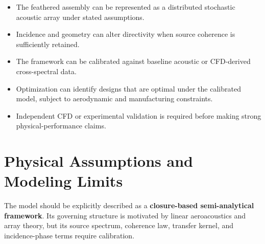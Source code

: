 \documentclass[11pt]{article}
\begin{document}
\begin{itemize}
    \item The feathered assembly can be represented as a distributed stochastic acoustic array under stated assumptions.
    \item Incidence and geometry can alter directivity when source coherence is sufficiently retained.
    \item The framework can be calibrated against baseline acoustic or CFD-derived cross-spectral data.
    \item Optimization can identify designs that are optimal under the calibrated model, subject to aerodynamic and manufacturing constraints.
    \item Independent CFD or experimental validation is required before making strong physical-performance claims.
\end{itemize}

\section{Physical Assumptions and Modeling Limits}

The model should be explicitly described as a \textbf{closure-based semi-analytical framework}. Its governing structure is motivated by linear aeroacoustics and array theory, but its source spectrum, coherence law, transfer kernel, and incidence-phase terms require calibration.
\end{document}
